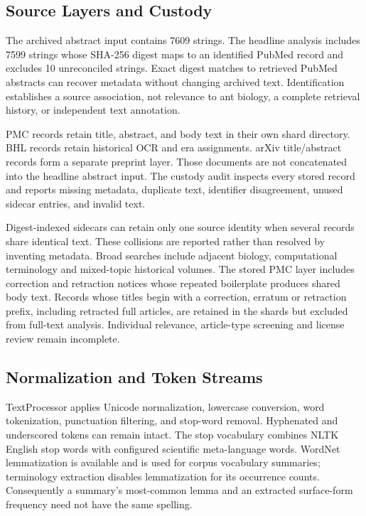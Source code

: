 \documentclass[
]{article}
\numberwithin{equation}{section}
\begin{document}
\subsection{Source Layers and Custody}\label{source-layers-and-custody}

The archived abstract input contains 7609 strings. The headline analysis
includes 7599 strings whose SHA-256 digest maps to an identified PubMed
record and excludes 10 unreconciled strings. Exact digest matches to
retrieved PubMed abstracts can recover metadata without changing
archived text. Identification establishes a source association, not
relevance to ant biology, a complete retrieval history, or independent
text annotation.

PMC records retain title, abstract, and body text in their own shard
directory. BHL records retain historical OCR and era assignments. arXiv
title/abstract records form a separate preprint layer. Those documents
are not concatenated into the headline abstract input. The custody audit
inspects every stored record and reports missing metadata, duplicate
text, identifier disagreement, unused sidecar entries, and invalid text.

Digest-indexed sidecars can retain only one source identity when several
records share identical text. These collisions are reported rather than
resolved by inventing metadata. Broad searches include adjacent biology,
computational terminology and mixed-topic historical volumes. The stored
PMC layer includes correction and retraction notices whose repeated
boilerplate produces shared body text. Records whose titles begin with a
correction, erratum or retraction prefix, including retracted full
articles, are retained in the shards but excluded from full-text
analysis. Individual relevance, article-type screening and license
review remain incomplete.

\subsection{Normalization and Token
Streams}\label{normalization-and-token-streams}

TextProcessor applies Unicode normalization, lowercase conversion, word
tokenization, punctuation filtering, and stop-word removal. Hyphenated
and underscored tokens can remain intact. The stop vocabulary combines
NLTK English stop words with configured scientific meta-language words.
WordNet lemmatization is available and is used for corpus vocabulary
summaries; terminology extraction disables lemmatization for its
occurrence counts. Consequently a summary's most-common lemma and an
extracted surface-form frequency need not have the same spelling.
\end{document}

